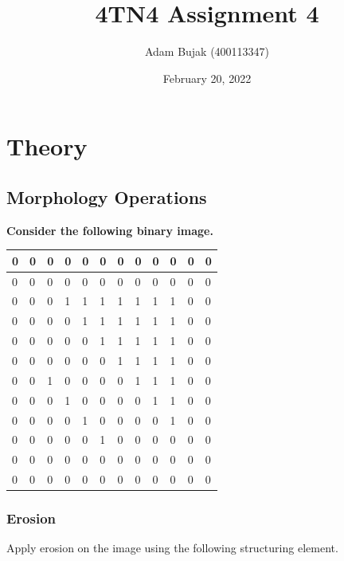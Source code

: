 \documentclass[12pt, letterpaper]{article}
\title{4TN4 Assignment 4}
\author{Adam Bujak (400113347)}
\date{February 20, 2022}
\begin{document}
\maketitle

\section{Theory}

\subsection{Morphology Operations}

\textbf{Consider the following binary image.}

\begin{table}[!ht]
    \centering
    \begin{tabular}{|l|l|l|l|l|l|l|l|l|l|l|l|}
    \hline
        0 & 0 & 0 & 0 & 0 & 0 & 0 & 0 & 0 & 0 & 0 & 0  \\ \hline
        0 & 0 & 0 & 0 & 0 & 0 & 0 & 0 & 0 & 0 & 0 & 0  \\ \hline
        0 & 0 & 0 & 1 & 1 & 1 & 1 & 1 & 1 & 1 & 0 & 0  \\ \hline
        0 & 0 & 0 & 0 & 1 & 1 & 1 & 1 & 1 & 1 & 0 & 0  \\ \hline
        0 & 0 & 0 & 0 & 0 & 1 & 1 & 1 & 1 & 1 & 0 & 0  \\ \hline
        0 & 0 & 0 & 0 & 0 & 0 & 1 & 1 & 1 & 1 & 0 & 0  \\ \hline
        0 & 0 & 1 & 0 & 0 & 0 & 0 & 1 & 1 & 1 & 0 & 0  \\ \hline
        0 & 0 & 0 & 1 & 0 & 0 & 0 & 0 & 1 & 1 & 0 & 0  \\ \hline
        0 & 0 & 0 & 0 & 1 & 0 & 0 & 0 & 0 & 1 & 0 & 0  \\ \hline
        0 & 0 & 0 & 0 & 0 & 1 & 0 & 0 & 0 & 0 & 0 & 0  \\ \hline
        0 & 0 & 0 & 0 & 0 & 0 & 0 & 0 & 0 & 0 & 0 & 0  \\ \hline
        0 & 0 & 0 & 0 & 0 & 0 & 0 & 0 & 0 & 0 & 0 & 0 \\ \hline
    \end{tabular}
\end{table}

\subsubsection{Erosion}

Apply erosion on the image using the following structuring element.
\end{document}
